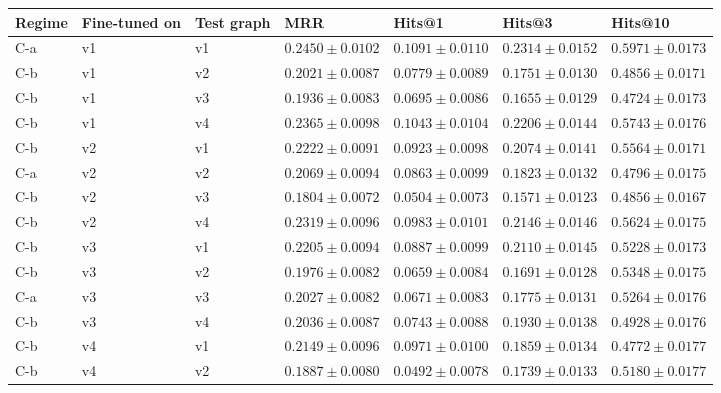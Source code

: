 \begin{table}[htbp]
\centering
\small
\renewcommand{\arraystretch}{1.15}
\setlength{\tabcolsep}{5pt}
\begin{adjustbox}{max width=\linewidth}
\begin{tabular}{|l|l|l|l|l|l|l|}
\hline
\textbf{Regime} & \textbf{Fine-tuned on} & \textbf{Test graph} & \textbf{MRR} & \textbf{Hits@1} & \textbf{Hits@3} & \textbf{Hits@10} \\
\hline
C-a & v1 & v1 & $0.2450 \pm 0.0102$ & $0.1091 \pm 0.0110$ & $0.2314 \pm 0.0152$ & $0.5971 \pm 0.0173$ \\
\hline
C-b & v1 & v2 & $0.2021 \pm 0.0087$ & $0.0779 \pm 0.0089$ & $0.1751 \pm 0.0130$ & $0.4856 \pm 0.0171$ \\
\hline
C-b & v1 & v3 & $0.1936 \pm 0.0083$ & $0.0695 \pm 0.0086$ & $0.1655 \pm 0.0129$ & $0.4724 \pm 0.0173$ \\
\hline
C-b & v1 & v4 & $0.2365 \pm 0.0098$ & $0.1043 \pm 0.0104$ & $0.2206 \pm 0.0144$ & $0.5743 \pm 0.0176$ \\
\hline
C-b & v2 & v1 & $0.2222 \pm 0.0091$ & $0.0923 \pm 0.0098$ & $0.2074 \pm 0.0141$ & $0.5564 \pm 0.0171$ \\
\hline
C-a & v2 & v2 & $0.2069 \pm 0.0094$ & $0.0863 \pm 0.0099$ & $0.1823 \pm 0.0132$ & $0.4796 \pm 0.0175$ \\
\hline
C-b & v2 & v3 & $0.1804 \pm 0.0072$ & $0.0504 \pm 0.0073$ & $0.1571 \pm 0.0123$ & $0.4856 \pm 0.0167$ \\
\hline
C-b & v2 & v4 & $0.2319 \pm 0.0096$ & $0.0983 \pm 0.0101$ & $0.2146 \pm 0.0146$ & $0.5624 \pm 0.0175$ \\
\hline
C-b & v3 & v1 & $0.2205 \pm 0.0094$ & $0.0887 \pm 0.0099$ & $0.2110 \pm 0.0145$ & $0.5228 \pm 0.0173$ \\
\hline
C-b & v3 & v2 & $0.1976 \pm 0.0082$ & $0.0659 \pm 0.0084$ & $0.1691 \pm 0.0128$ & $0.5348 \pm 0.0175$ \\
\hline
C-a & v3 & v3 & $0.2027 \pm 0.0082$ & $0.0671 \pm 0.0083$ & $0.1775 \pm 0.0131$ & $0.5264 \pm 0.0176$ \\
\hline
C-b & v3 & v4 & $0.2036 \pm 0.0087$ & $0.0743 \pm 0.0088$ & $0.1930 \pm 0.0138$ & $0.4928 \pm 0.0176$ \\
\hline
C-b & v4 & v1 & $0.2149 \pm 0.0096$ & $0.0971 \pm 0.0100$ & $0.1859 \pm 0.0134$ & $0.4772 \pm 0.0177$ \\
\hline
C-b & v4 & v2 & $0.1887 \pm 0.0080$ & $0.0492 \pm 0.0078$ & $0.1739 \pm 0.0133$ & $0.5180 \pm 0.0177$ \\

\end{tabular}
\end{adjustbox}
\end{table}
